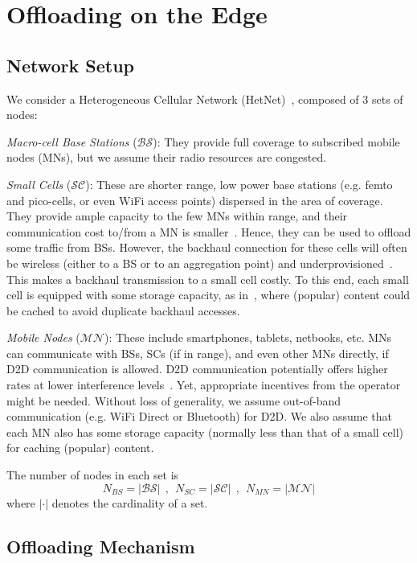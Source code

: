 \documentclass[10pt,conference,letterpaper]{IEEEtran}
\begin{document}
\section{Offloading on the Edge}\label{sec:system-model}
\subsection{Network Setup}
We consider a Heterogeneous Cellular Network (HetNet)~\cite{HetNets-paradigm}, composed of 3 sets of nodes: 

\textit{Macro-cell Base Stations} ($\mathcal{BS}$): They provide full coverage to subscribed mobile nodes (MNs), but we assume their radio resources are congested. 

\textit{Small Cells} ($\mathcal{SC}$): These are shorter range, low power base stations (e.g. femto and pico-cells, or even WiFi access points) dispersed in the area of coverage. They provide ample capacity to the few MNs within range, and their communication cost to/from a MN is smaller~\cite{johansson2007cost}. Hence, they can be used to offload some traffic from BSs. However, the backhaul connection for these cells will often be wireless (either to a BS or to an aggregation point) and underprovisioned~\cite{femtocaching}. This makes a backhaul transmission to a small cell costly. To this end, each small cell is equipped with some storage capacity, as in~\cite{femtocaching,poularakis-video-HetNets}, where (popular) content could be cached to avoid duplicate backhaul accesses.

\textit{Mobile Nodes} ($\mathcal{MN}$): These include smartphones, tablets, netbooks, etc. MNs can communicate with BSs, SCs (if in range), and even other MNs directly, if D2D communication is allowed. D2D communication potentially offers higher rates at lower interference levels~\cite{survey-d2d}. Yet, appropriate incentives from the operator might be needed.  Without loss of generality, we assume out-of-band communication (e.g. WiFi Direct or Bluetooth) for D2D. We also assume that each MN also has some storage capacity (normally less than that of a small cell) for caching (popular) content. 

The number of nodes in each set is
\begin{equation*}
N_{BS} = |\mathcal{BS}|~~,~~N_{SC} = |\mathcal{SC}|~~,~~N_{MN} = |\mathcal{MN}|
\end{equation*}
where $|\cdot|$ denotes the cardinality of a set.

\subsection{Offloading Mechanism}\label{sec:system-communication}
\end{document}
